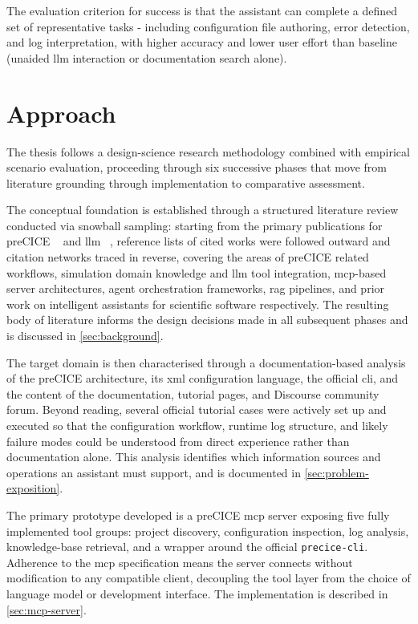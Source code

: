 \documentclass[
  numbers=noenddot,
  english,
  a4paper,
  twoside,
  bibliography=totoc,
  headsepline,
  cleardoublepage=empty,
  parskip=half,
  draft=false
]{scrbook}
\theoremstyle{break}
\renewcommand{\_}{\textunderscore\allowbreak}
\begin{document}
The evaluation criterion for success is that the assistant can complete a defined set of
representative tasks - including configuration file authoring, error detection, and log
interpretation, with higher accuracy and lower user effort than baseline (unaided \gls{llm}
interaction or documentation search alone).


\section{Approach}\label{sec:introduction:method}

The thesis follows a design-science research methodology combined with empirical scenario
evaluation, proceeding through six successive phases that move from literature grounding
through implementation to comparative assessment.

The conceptual foundation is established through a structured literature review conducted via
snowball sampling: starting from the primary publications for preCICE ~\cite{chourdakis2022precice} 
and \gls{llm} ~\cite{hou2024largelanguagemodels},
reference lists of cited works were followed outward and citation networks traced in reverse,
covering the areas of preCICE related workflows, simulation domain knowledge and \gls{llm} tool integration, 
\gls{mcp}-based server architectures, agent
orchestration frameworks, \gls{rag} pipelines, and prior work on intelligent assistants for
scientific software respectively.
The resulting body of literature informs the design decisions made in all subsequent phases
and is discussed in \cref{sec:background}.

The target domain is then characterised through a documentation-based analysis of the
preCICE architecture, its \gls{xml} configuration language, the official \gls{cli}, and the
content of the documentation, tutorial pages, and Discourse community forum.
Beyond reading, several official tutorial cases were actively set up and executed so that the
configuration workflow, runtime log structure, and likely failure modes could be understood
from direct experience rather than documentation alone.
This analysis identifies which information sources and operations an assistant must support,
and is documented in \cref{sec:problem-exposition}.

The primary prototype developed is a preCICE \gls{mcp} server exposing five fully implemented tool
groups: project discovery, configuration inspection, log analysis, knowledge-base retrieval,
and a wrapper around the official \texttt{precice-cli}.
Adherence to the \gls{mcp} specification means the server connects without modification to
any compatible client, decoupling the tool layer from the choice of language model or
development interface.
The implementation is described in \cref{sec:mcp-server}.
\end{document}
